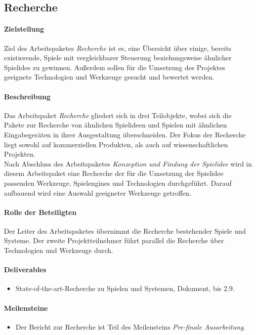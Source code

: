 \subsection{Recherche}

\paragraph{Zielstellung}\noindent
Ziel des Arbeitspaketes \textit{Recherche} ist es, eine Übersicht über einige, bereits existierende, Spiele mit vergleichbarer Steuerung beziehungsweise ähnlicher Spielidee zu gewinnen. Außerdem sollen für die Umsetzung des Projektes geeignete Technologien und Werkzeuge gesucht und bewertet werden.

\paragraph{Beschreibung}\noindent
Das Arbeitspaket \textit{Recherche} gliedert sich in drei Teilobjekte, wobei sich die Pakete zur Recherche von ähnlichen Spielideen und Spielen mit ähnlichen Eingabegeräten in ihrer Ausgestaltung überschneiden. Der Fokus der Recherche liegt sowohl auf kommerziellen Produkten, als auch auf wissenschaftlichen Projekten.\\
Nach Abschluss des Arbeitspaketes \textit{Konzeption und Findung der Spielidee} wird in diesem Arbeitspaket eine Recherche der für die Umsetzung der Spielidee passenden Werkzeuge, Spielengines und Technologien durchgeführt. Darauf aufbauend wird eine Auswahl geeigneter Werkzeuge getroffen.

\paragraph{Rolle der Beteiligten}\noindent
Der Leiter des Arbeitspaketes übernimmt die Recherche bestehender Spiele und Systeme. Der zweite Projektteilnehmer führt parallel die Recherche über Technologien und Werkzeuge durch.

\paragraph{Deliverables}\noindent
\begin{itemize}
\item State-of-the-art-Recherche zu Spielen und Systemen, Dokument, bis 2.9.
\end{itemize}

\paragraph{Meilensteine}\noindent
\begin{itemize}
\item Der Bericht zur Recherche ist Teil des Meilensteins \textit{Pre-finale Ausarbeitung}.
\end{itemize}
